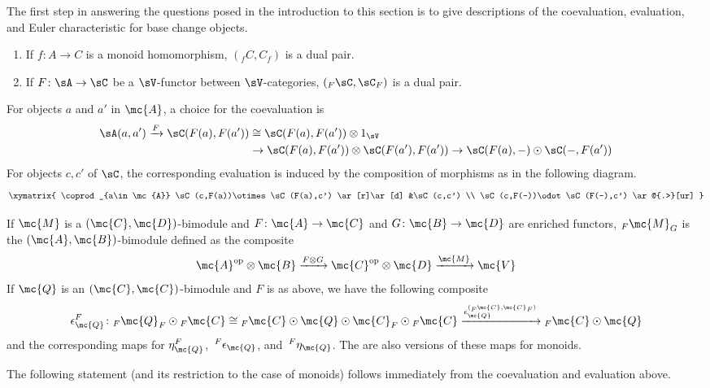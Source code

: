 \documentclass[11pt]{amsart}
\newcommand{\xto}{\xrightarrow}
\newcommand{\rsm}[4]{{#1}^{({#2},{#3})}_{#4}} %
\newcommand{\rbm}[4]{{#1}^{#2}_{#4}} %
\newcommand{\lbm}[4]{\,^{#2}{#1}_{#4}}  %
\begin{document}
The first step in answering the questions posed in the introduction to this section is to give descriptions of the coevaluation, evaluation, and Euler characteristic for base change objects.

\begin{prop}\cite[Appendix]{p:thesis}\cite[Lem.~7.6]{ps:indexed}\label{lem:base_change_euler}
\begin{enumerate}
  \item If $f\colon A\to C$ is a monoid homomorphism, $(_fC,C_f)$ is a dual pair.
  \item If $F\colon \sA\to \sC$ be a $\sV$-functor between $\sV$-categories, $({_F\sC},\sC_F)$ is a dual pair.
\end{enumerate}
\end{prop}

For objects $a$ and $a'$ in $\mc{A}$, a choice for the   
coevaluation is
\begin{align*}
 {\sA}(a,a')\xto{F} \sC(F(a),F(a'))&\cong \sC(F(a),F(a'))\otimes 1_{\sV}
 \\
 &\to \sC(F(a),F(a'))\otimes\sC(F(a'),F(a'))\to \sC(F(a),-)\odot\sC(-,F(a')) 
\end{align*}
For objects 
$c,c'$ of $\sC$, the corresponding  evaluation 
is induced by the composition of morphisms as in the following diagram.
\[\xymatrix{ 
  \coprod_{a\in \mc{A}} \sC(c,F(a))\otimes \sC(F(a),c') \ar[r]\ar[d]
  &\sC(c,c')
  \\
  \sC(c,F(-))\odot \sC(F(-),c') \ar@{.>}[ur]
}\]

If $\mc{M}$ is a $(\mc{C},\mc{D})$-bimodule and $F\colon \mc{A}\to \mc{C}$ and $G\colon \mc{B}\to \mc{D}$ are enriched functors, 
${_F\mc{M}_G}$ is the $(\mc{A},\mc{B})$-bimodule defined as the composite 
\[
  \mc{A}^{\text{op}}\otimes \mc{B}\xto{F\otimes G}\mc{C}^{\text{op}}\otimes \mc{D}\xto{\mc{M}}\mc{V}
\]
If $\mc{Q}$ is an $(\mc{C},\mc{C})$-bimodule and $F$ is as above, we have the following composite 
\[
  \rbm{\epsilon}{F}{\mc{C}}{\mc{Q}}\colon {_F\mc{Q}_F}\odot {_F\mc{C}}
  \cong {_F\mc{C}}\odot \mc{Q}\odot \mc{C}_F\odot {_F\mc{C}} 
  \xto{\rsm{\epsilon}{_F\mc{C}}{\mc{C}_F}{\mc{Q}}}{_F\mc{C}}\odot \mc{Q} 
\]
and the corresponding maps for $\rbm{\eta}{F}{\mc{C}}{\mc{Q}}$, $\lbm{\epsilon}{F}{\mc{C}}{\mc{Q}}$, and $\lbm{\eta}{F}{\mc{C}}{\mc{Q}}$.    The are also versions of these maps for monoids.


The following statement (and its restriction to the case of monoids) follows immediately from the 
coevaluation and evaluation above.
 
\end{document}
